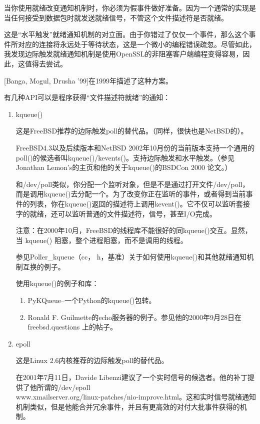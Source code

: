 \documentclass[twoside, xetex]{report}
\begin{document}
	当你使用就绪改变通知机制时，你必须为假事件做好准备。因为一个通常的实现是当任何接受到数据包时就发送就绪信号，不管这个文件描述符是否就绪。
	
	这是“水平触发”就绪通知机制的对立面。由于你错过了仅仅一个事件，那么这个事件所对应的连接将永远处于等待状态，这是一个微小的编程错误疏忽。尽管如此，我发现边际触发就绪通知机制是使用OpenSSL的非阻塞客户端编程变得容易，因此，这值得去尝试。
	
	[Banga, Mogul, Drusha '99]在1999年描述了这种方案。
	
	有几种API可以是程序获得“文件描述符就绪”的通知：
	\begin{enumerate}
	
	\item kqueue()
	
	这是FreeBSD推荐的边际触发poll的替代品。（同样，很快也是NetBSD的）。
	
	FreeBSD4.3以及后续版本和NetBSD 2002年10月份的当前版本支持一个通用的poll()的候选者叫kqueue()/kevents()。支持边际触发和水平触发。（参见Jonathan Lemon's的主页和他的关于kqueue()的BSDCon 2000 论文。）
	
	和/dev/poll类似，你分配一个监听对象，但是不是通过打开文件/dev/poll，而是调用kqueue()去分配一个。为了改变你正在监听的事件，或者得到当前事件的列表，你在kqueue()返回的描述符上调用kevent()。它不仅可以监听套接字的就绪，还可以监听普通的文件描述符，信号，甚至I/O完成。
	
	注意：在2000年10月，FreeBSD的线程库不能很好的同kqueue()交互。显然，当 kqueue() 阻塞，整个进程阻塞，而不是调用的线程。
	
	参见Poller\_kqueue（cc， h，基准）关于如何使用kqueue()和其他就绪通知机制互换的例子。
	
	使用kqueue()的例子和库：
		\begin{enumerate}
			\item PyKQueue--一个Python的kqueue()包转。
			\item Ronald F. Guilmette的echo服务器的例子。参见他的2000年9月28日在\\freebsd.questions 上的帖子。
		\end{enumerate}
	\item epoll
	
	这是Linux 2.6内核推荐的边际触发poll的替代品。
	
	在2001年7月11日，Davide Libenzi建议了一个实时信号的候选者。他的补丁提供了他所谓的/dev/epoll\\www.xmailserver.org/linux-patches/nio-improve.html。这和实时信号就绪通知机制类似，但是他能合并冗余事件，并且有更高效的对付大批事件获得的机制。
	

\end{enumerate}
\end{document}
